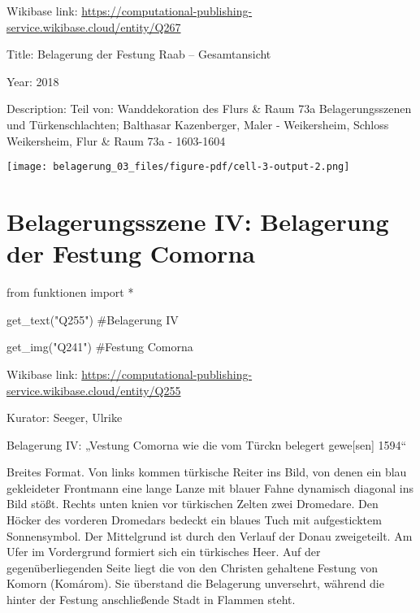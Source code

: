 \documentclass[
  a4paper,
  portrait]{book}
\newenvironment{Shaded}{\begin{snugshade}}{\end{snugshade}}
\newcommand{\CommentTok}[1]{\textcolor[rgb]{0.37,0.37,0.37}{#1}}
\newcommand{\ImportTok}[1]{\textcolor[rgb]{0.00,0.46,0.62}{#1}}
\newcommand{\NormalTok}[1]{\textcolor[rgb]{0.00,0.23,0.31}{#1}}
\newcommand{\OperatorTok}[1]{\textcolor[rgb]{0.37,0.37,0.37}{#1}}
\newcommand{\StringTok}[1]{\textcolor[rgb]{0.13,0.47,0.30}{#1}}
\begin{document}
Wikibase link:
\url{https://computational-publishing-service.wikibase.cloud/entity/Q267}

Title: Belagerung der Festung Raab -- Gesamtansicht

Year: 2018

Description: Teil von: Wanddekoration des Flurs \& Raum 73a
Belagerungsszenen und Türkenschlachten; Balthasar Kazenberger, Maler -
Weikersheim, Schloss Weikersheim, Flur \& Raum 73a - 1603-1604

\texttt{[image: belagerung\_03\_files/figure-pdf/cell-3-output-2.png]}

\chapter{Belagerungsszene IV: Belagerung der Festung
Comorna}\label{belagerungsszene-iv-belagerung-der-festung-comorna}

\begin{Shaded}
\begin{Highlighting}[]
\ImportTok{from}\NormalTok{ funktionen }\ImportTok{import} \OperatorTok{*}
\end{Highlighting}
\end{Shaded}

\begin{Shaded}
\begin{Highlighting}[]
\NormalTok{get\_text(}\StringTok{"Q255"}\NormalTok{)}
\CommentTok{\#Belagerung IV}

\NormalTok{get\_img(}\StringTok{"Q241"}\NormalTok{)}
\CommentTok{\#Festung Comorna}
\end{Highlighting}
\end{Shaded}

Wikibase link:
\url{https://computational-publishing-service.wikibase.cloud/entity/Q255}

Kurator: Seeger, Ulrike

Belagerung IV: „Vestung Comorna wie die vom Türckn belegert
gewe{[}sen{]} 1594``

Breites Format. Von links kommen türkische Reiter ins Bild, von denen
ein blau gekleideter Frontmann eine lange Lanze mit blauer Fahne
dynamisch diagonal ins Bild stößt. Rechts unten knien vor türkischen
Zelten zwei Dromedare. Den Höcker des vorderen Dromedars bedeckt ein
blaues Tuch mit aufgesticktem Sonnensymbol. Der Mittelgrund ist durch
den Verlauf der Donau zweigeteilt. Am Ufer im Vordergrund formiert sich
ein türkisches Heer. Auf der gegenüberliegenden Seite liegt die von den
Christen gehaltene Festung von Komorn (Komárom). Sie überstand die
Belagerung unversehrt, während die hinter der Festung anschließende
Stadt in Flammen steht.
\end{document}
